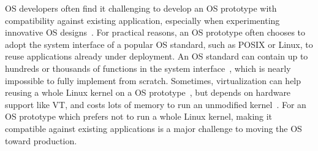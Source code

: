 \begin{comment}
However, implementing compatibility can cause a dilemma, when supporting a new hardware platform that affects a large amount of system interfaces.
For example, an unconventional memory architecture, such as NUMA (Non-uniform Memory Architecture) would affect every system interface that access shared, kernel state across memory units.
As another example,
the Intel SGX (Software Guard Extensions) moves an application into an isolated environment protected by the CPU, and treats all system interfaces
provided by the OS as untrustworthy.
Supporting these new hardware platforms, for the existing, unmodified applications, 
poses a tremendous challenge for OS developers.
OS developers have to update a substantial portion of the OS implementation,
without disrupting the support for existing system interfaces.
The OS development process can be both painful and time-comsuming.
\end{comment}



OS developers often find it challenging to develop an OS prototype with compatibility against existing application,
especially when experimenting innovative OS designs~\cite{baumann09barrelfish,unikernels,zeldovich+histar,libra,peter14arrakis,belay14ix}.
For practical reasons, 
an OS prototype often chooses to adopt the system interface of a popular OS standard, such as POSIX or Linux, to reuse applications already under deployment.
An OS standard can contain up to hundreds or thousands of functions in the system interface~\cite{ieee-posix, linux-man-syscall},
which is nearly impossible to fully implement from scratch.
Sometimes, virtualization can help reusing a whole Linux kernel on a OS prototype~\cite{baumann09barrelfish}, but depends on hardware support like VT, and costs lots of memory to run an unmodified kernel~\cite{agarwal15container}.
For an OS prototype which prefers not to run a whole Linux kernel, making it compatible against existing applications is a major challenge to moving the OS toward production.


